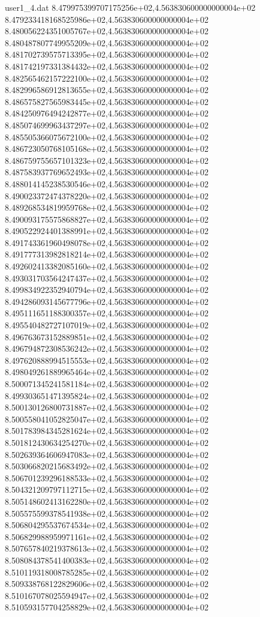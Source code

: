\begin{filecontents}{user1_4.dat}
8.479975399707175256e+02,4.563830600000000004e+02
8.479233418168525986e+02,4.563830600000000004e+02
8.480056224351005767e+02,4.563830600000000004e+02
8.480487807749955209e+02,4.563830600000000004e+02
8.481702739575713395e+02,4.563830600000000004e+02
8.481742197331384432e+02,4.563830600000000004e+02
8.482565462157222100e+02,4.563830600000000004e+02
8.482996586912813655e+02,4.563830600000000004e+02
8.486575827565983445e+02,4.563830600000000004e+02
8.484250976494242877e+02,4.563830600000000004e+02
8.485074699963437297e+02,4.563830600000000004e+02
8.485505366075672100e+02,4.563830600000000004e+02
8.486723050768105168e+02,4.563830600000000004e+02
8.486759755657101323e+02,4.563830600000000004e+02
8.487583937769652493e+02,4.563830600000000004e+02
8.488014145238530546e+02,4.563830600000000004e+02
8.490023372474378220e+02,4.563830600000000004e+02
8.489268534819959768e+02,4.563830600000000004e+02
8.490093175575868827e+02,4.563830600000000004e+02
8.490522924401388991e+02,4.563830600000000004e+02
8.491743361960498078e+02,4.563830600000000004e+02
8.491777313982818214e+02,4.563830600000000004e+02
8.492602413382085160e+02,4.563830600000000004e+02
8.493031703564247437e+02,4.563830600000000004e+02
8.499834922352940794e+02,4.563830600000000004e+02
8.494286093145677796e+02,4.563830600000000004e+02
8.495111651188300357e+02,4.563830600000000004e+02
8.495540482727107019e+02,4.563830600000000004e+02
8.496763673152889851e+02,4.563830600000000004e+02
8.496794872308536242e+02,4.563830600000000004e+02
8.497620888994515553e+02,4.563830600000000004e+02
8.498049261889965464e+02,4.563830600000000004e+02
8.500071345241581184e+02,4.563830600000000004e+02
8.499303651471395824e+02,4.563830600000000004e+02
8.500130126800731887e+02,4.563830600000000004e+02
8.500558041052825047e+02,4.563830600000000004e+02
8.501783984345281624e+02,4.563830600000000004e+02
8.501812430634254270e+02,4.563830600000000004e+02
8.502639364606947083e+02,4.563830600000000004e+02
8.503066820215683492e+02,4.563830600000000004e+02
8.506701239296188533e+02,4.563830600000000004e+02
8.504321209797112715e+02,4.563830600000000004e+02
8.505148602413162280e+02,4.563830600000000004e+02
8.505575599378541938e+02,4.563830600000000004e+02
8.506804295537674534e+02,4.563830600000000004e+02
8.506829988959971161e+02,4.563830600000000004e+02
8.507657840219378613e+02,4.563830600000000004e+02
8.508084378541400383e+02,4.563830600000000004e+02
8.510119318008785285e+02,4.563830600000000004e+02
8.509338768122829606e+02,4.563830600000000004e+02
8.510167078025594947e+02,4.563830600000000004e+02
8.510593157704258829e+02,4.563830600000000004e+02

\end{filecontents}
